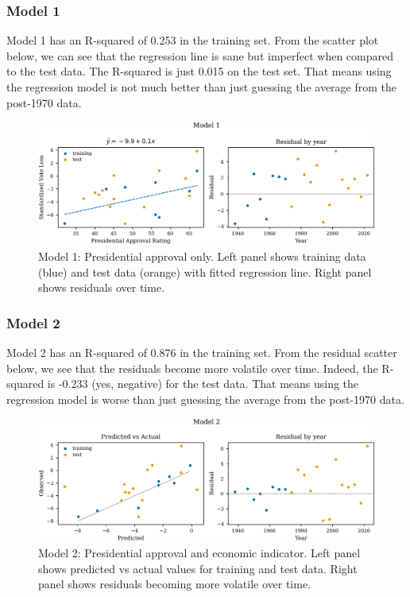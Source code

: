 \subsubsection{Model 1}

Model 1 has an R-squared of 0.253 in the training set. From the scatter plot below, we can see that the regression line is sane but imperfect when compared to the test data. The R-squared is just 0.015 on the test set. That means using the regression model is not much better than just guessing the average from the post-1970 data.


\begin{figure}[H]
\centering
\includegraphics[width=\textwidth]{images/model1_scatter.pdf}
\caption{Model 1: Presidential approval only. Left panel shows training data (blue) and test data (orange) with fitted regression line. Right panel shows residuals over time.}
\end{figure}

\subsubsection{Model 2}

Model 2 has an R-squared of 0.876 in the training set. From the residual scatter below, we see that the residuals become more volatile over time. Indeed, the R-squared is -0.233 (yes, negative) for the test data. That means using the regression model is worse than just guessing the average from the post-1970 data.

\begin{figure}[H]
\centering
\includegraphics[width=\textwidth]{images/model2_scatter.pdf}
\caption{Model 2: Presidential approval and economic indicator. Left panel shows predicted vs actual values for training and test data. Right panel shows residuals becoming more volatile over time.}
\end{figure}

